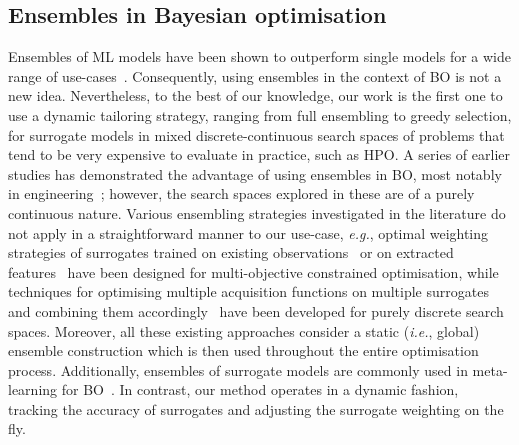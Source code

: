 \subsection{Ensembles in Bayesian optimisation}
Ensembles of ML models have been shown to outperform single models for a wide range of use-cases~\citep{SagRok18,OpiMac99,Rokach10,DonEtAl20}. 
Consequently, using ensembles in the context of BO is not a new idea.
Nevertheless, to the best of our knowledge, our work is the first one to use a 
dynamic tailoring strategy, ranging from full ensembling to greedy selection, for surrogate models in mixed discrete-continuous search spaces of problems that tend to be very expensive to evaluate in practice, such as HPO.
A series of earlier studies has demonstrated the advantage of using ensembles in BO, most notably in engineering~\citep{JiaEtAl20,ZhoEtAl11}; however, the search spaces explored in these are of a purely continuous nature.
Various ensembling strategies investigated in the literature do not apply in a straightforward manner to our use-case, \emph{e.g.}, optimal weighting strategies of surrogates trained on existing observations~\citep{HanEtAl22} or on extracted features~\citep{GuoEtAl19} have been designed for multi-objective constrained optimisation, while techniques for optimising multiple acquisition functions on multiple surrogates and combining them accordingly~\citep{HuaEtAl22c, BeaEtAl19} have been developed for purely discrete search spaces.
Moreover, all these existing approaches consider a static (\emph{i.e.}, global) ensemble construction which is then used throughout the entire optimisation process. Additionally, ensembles of surrogate models are commonly used in meta-learning for BO~\citep{WisEtAl16,FeuEtAl22}. 
In contrast, our method operates in a dynamic fashion, tracking the accuracy of surrogates and adjusting the surrogate weighting on the fly.

